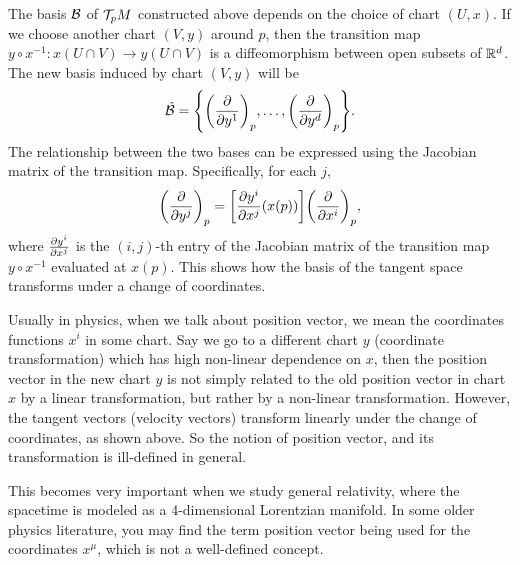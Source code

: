\begin{remark}
    The basis \(\mathcal B\) of \(\mathcal T_p M\) constructed above depends on the choice of chart \((U, x)\). If we choose another chart \((V, y)\) around \(p\), then the transition map \(y \circ x^{-1}: x(U \cap V) \to y(U \cap V)\) is a diffeomorphism between open subsets of \(\mathbb R^d\). The new basis induced by chart \((V, y)\) will be
    \begin{equation}
        \tilde{\mathcal B} = \qty{\qty(\pdv{y^1})_p, \ldots, \qty(\pdv{y^d})_p}.
    \end{equation}
    The relationship between the two bases can be expressed using the Jacobian matrix of the transition map. Specifically, for each \(j\),
    \begin{equation}
        \qty(\pdv{y^j})_p = \qty[\pdv{y^i}{x^j} \qty(x(p))] \qty(\pdv{x^i})_p,
    \end{equation}
    where \(\pdv{y^i}{x^j}(x(p))\) is the \((i,j)\)-th entry of the Jacobian matrix of the transition map \(y \circ x^{-1}\) evaluated at \(x(p)\). This shows how the basis of the tangent space transforms under a change of coordinates.
\end{remark}
Usually in physics, when we talk about position vector, we mean the coordinates functions \(x^i\) in some chart. Say we go to a different chart \(y\) (coordinate transformation) which has high non-linear dependence on \(x\), then the position vector in the new chart \(y\) is not simply related to the old position vector in chart \(x\) by a linear transformation, but rather by a non-linear transformation. However, the tangent vectors (velocity vectors) transform linearly under the change of coordinates, as shown above. So the notion of position vector, and its transformation is ill-defined in general.

This becomes very important when we study general relativity, where the spacetime is modeled as a 4-dimensional Lorentzian manifold. In some older physics literature, you may find the term position vector being used for the coordinates \(x^\mu\), which is not a well-defined concept.
